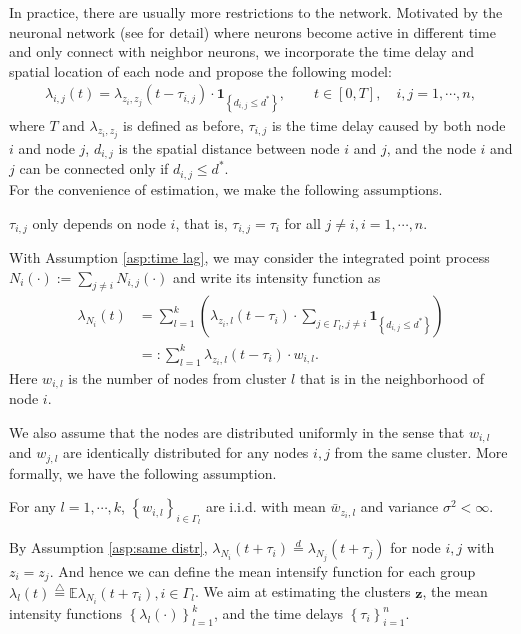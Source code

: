 In practice, there are usually more restrictions to the network. 
Motivated by the neuronal network (see \cite{Wan2019} for detail) where neurons become active in different time and only connect with neighbor neurons, we incorporate the time delay and spatial location of each node and propose the following model:
\begin{align*}
\lambda_{i,j}(t)
=\lambda_{z_i,z_j}(t-\tau_{i,j})
\cdot \mathbf{1}_{\left\{ d_{i,j}\leq d^* \right\}}, 
\qquad t\in[0,T],\quad i,j=1,\cdots,n, 
\end{align*}
where $T$ and $\lambda_{z_i,z_j}$ is defined as before, $\tau_{i,j}$ is the time delay caused by both node $i$ and node $j$, $d_{i,j}$ is the spatial distance between node $i$ and $j$, and the node $i$ and $j$ can be connected only if $d_{i,j}\leq d^*$.
\\
For the convenience of estimation, we make the following assumptions.
\begin{assumption}\label{asp:time lag}
$\tau_{i,j}$ only depends on node $i$, that is,
$\tau_{i,j}=\tau_i $ for all $j\neq i, i=1,\cdots,n$.
\end{assumption}


\noindent With Assumption \ref{asp:time lag}, 
we may consider the integrated point process ${N}_{i}(\cdot):=\sum_{j\neq i}N_{i,j}(\cdot)$
and write its intensity function as
\begin{align*}
\lambda_{N_i}(t) &= \sum_{l=1}^k \left( \lambda_{z_i,l}(t-\tau_i)\cdot \sum_{j\in\Gamma_l,j\neq i}\mathbf{1}_{\left\{ d_{i,j}\leq d^* \right\}} \right) \\
&=: \sum_{l=1}^k  \lambda_{z_i,l}(t-\tau_i)\cdot w_{i,l}.
\end{align*}
Here $w_{i,l}$ is the number of nodes from cluster $l$ that is in the neighborhood of node $i$.

\noindent We also assume that the nodes are distributed uniformly in the sense that $w_{i,l}$ and $w_{j,l}$ are identically distributed for any nodes $i, j$ from the same cluster.
More formally, we have the following assumption.

\begin{assumption}\label{asp:same distr}
For any $l=1,\cdots,k$, $\left\{ w_{i,l} \right\}_{i\in\Gamma_l}$ are i.i.d. with mean $\bar w_{z_i,l}$ and variance $\sigma^2<\infty$.
\end{assumption}
\noindent
By Assumption \ref{asp:same distr},
$\lambda_{N_i}(t+\tau_i)\overset{d}{=}\lambda_{N_j}(t+\tau_j)$ for node $i,j$ with $z_i=z_j$.
And hence we can define the mean intensify function for each group $\lambda_l(t)\overset{\triangle}{=}\mathbb{E}\lambda_{N_i}(t+\tau_i),i\in\Gamma_l$.
We aim at estimating the clusters $\mathbf{z}$, the mean intensity functions $\left\{ \lambda_{l}(\cdot) \right\}_{l=1}^k$, and the time delays $\left\{ \tau_i \right\}_{i=1}^n$.

